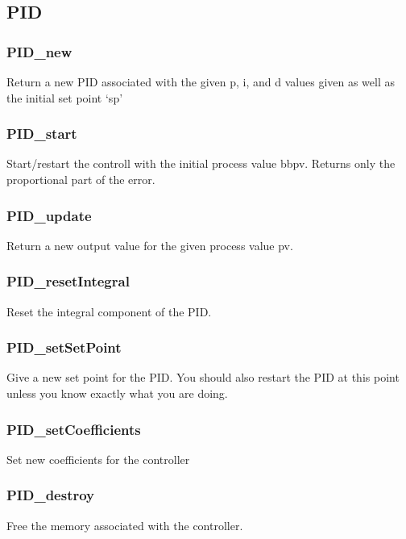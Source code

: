 \subsection{PID} \label{apipid}
\subsubsection{PID\_new} \label{apipidnew}
 Return a new PID
associated with the given p, i, and d values given as well as the initial set
point `sp'

\subsubsection{PID\_start} \label{apipidstart}
 Start/restart the controll with
the initial process value bbpv. Returns only the proportional part of the error.

\subsubsection{PID\_update} \label{apipidupdate}
 Return a new output value for the
given process value pv.

\subsubsection{PID\_resetIntegral} \label{apipidresetint}
 Reset the integral component of the PID.

\subsubsection{PID\_setSetPoint} \label{apipidsetsp}
 Give a new set point for the
PID. You should also restart the PID at this point unless you know exactly what
you are doing.

\subsubsection{PID\_setCoefficients} \label{apipidsetcoff}
 Set new
coefficients for the controller

\subsubsection{PID\_destroy} \label{apipiddestroy}
 Free the memory associated with the
controller.

